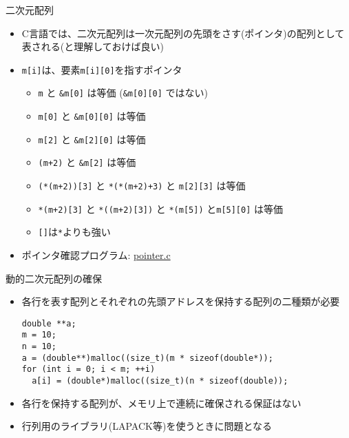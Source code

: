 \begin{frame}[t,fragile]{二次元配列}
  \begin{itemize}
    \setlength{\itemsep}{1em}
  \item C言語では、二次元配列は一次元配列の先頭をさす(ポインタ)の配列として表される(と理解しておけば良い)
  \item \verb+m[i]+は、要素\verb+m[i][0]+を指すポインタ
    \begin{itemize}
    \item \verb+m+ と \verb+&m[0]+ は等価 (\verb+&m[0][0]+ ではない)
    \item \verb+m[0]+ と \verb+&m[0][0]+ は等価
    \item \verb+m[2]+ と \verb+&m[2][0]+ は等価
    \item \verb^(m+2)^ と \verb^&m[2]^ は等価
    \item \verb^(*(m+2))[3]^ と \verb^*(*(m+2)+3)^ と \verb^m[2][3]^ は等価
    \item \verb^*(m+2)[3]^ と \verb^*((m+2)[3])^ と \verb^*(m[5])^ と\verb^m[5][0]^ は等価
    \item \verb^[]^は\verb^*^よりも強い
    \end{itemize}
  \item ポインタ確認プログラム: \href{https://github.com/todo-group/computer-experiments/blob/master/exercise/matrix/pointer.c}{pointer.c}
  \end{itemize}
\end{frame}

\begin{frame}[t,fragile]{動的二次元配列の確保}
  \begin{itemize}
    \setlength{\itemsep}{1em}
  \item 各行を表す配列とそれぞれの先頭アドレスを保持する配列の二種類が必要
\begin{lstlisting}
double **a;
m = 10;  
n = 10;  
a = (double**)malloc((size_t)(m * sizeof(double*));
for (int i = 0; i < m; ++i)
  a[i] = (double*)malloc((size_t)(n * sizeof(double));
\end{lstlisting}
\item 各行を保持する配列が、メモリ上で連続に確保される保証はない
\item 行列用のライブラリ(LAPACK等)を使うときに問題となる
  \end{itemize}
\end{frame}

